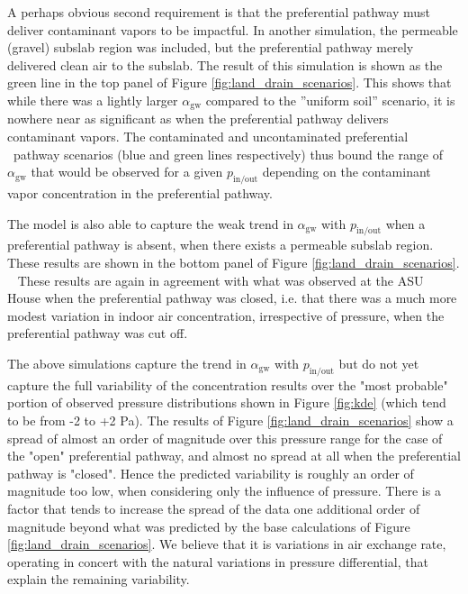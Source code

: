 \documentclass[journal=esthag,manuscript=article]{achemso}
\begin{document}
A perhaps obvious second requirement is that the preferential pathway must deliver contaminant vapors to be impactful.
In another simulation, the permeable (gravel) subslab region was included, but the preferential pathway merely delivered clean air to the subslab.
The result of this simulation is shown as the green line in the top panel of Figure \ref{fig:land_drain_scenarios}.
This shows that while there was a lightly larger $\alpha_\mathrm{gw}$ compared to the ”uniform soil” scenario, it is nowhere near as significant as when the preferential pathway delivers contaminant vapors.
The contaminated and uncontaminated preferential  pathway scenarios (blue and green lines respectively) thus bound the range of $\alpha_\mathrm{gw}$ that would be observed for a given $p_\mathrm{in/out}$ depending on the contaminant vapor concentration in the preferential pathway.\par

The model is also able to capture the weak trend in $\alpha_\mathrm{gw}$ with $p_\mathrm{in/out}$ when a preferential pathway is absent, when there exists a permeable subslab region.
These results are shown in the bottom panel of Figure \ref{fig:land_drain_scenarios}.  
These results are again in agreement with what was observed at the ASU House when the preferential pathway was closed, i.e. that there was a much more modest variation in indoor air concentration, irrespective of pressure, when the preferential pathway was cut off.\par

The above simulations capture the trend in $\alpha_\mathrm{gw}$ with $p_\mathrm{in/out}$ but do not yet capture the full variability of the concentration results over the "most probable" portion of observed pressure distributions shown in Figure \ref{fig:kde} (which tend to be from -2 to +2 Pa).
The results of Figure \ref{fig:land_drain_scenarios} show a spread of almost an order of magnitude over this pressure range for the case of the "open" preferential pathway, and almost no spread at all when the preferential pathway is "closed".
Hence the predicted variability is roughly an order of magnitude too low, when considering only the influence of pressure.
There is a factor that tends to increase the spread of the data one additional order of magnitude beyond what was predicted by the base calculations of Figure \ref{fig:land_drain_scenarios}.
We believe that it is variations in air exchange rate, operating in concert with the natural variations in pressure differential, that explain the remaining variability.\par
\end{document}
